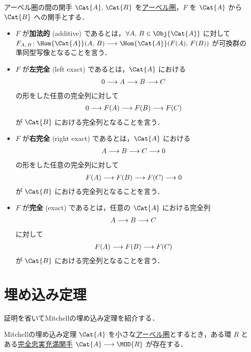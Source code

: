 \documentclass[algtopo_main]{subfiles}
\begin{document}
\begin{mydef}[label=def:Ab-func]{アーベル圏の間の関手}
    $\Cat{A},\, \Cat{B}$ を\hyperref[def:Abel]{アーベル圏}，$F$ を $\Cat{A}$ から $\Cat{B}$ への関手とする．
    \begin{itemize}
        \item $F$ が\textbf{加法的} (additive) であるとは，$\forall A,\, B \in \Obj{\Cat{A}}$ に対して
        $F_{A,\, B} \colon \Hom{\Cat{A}}(A,\, B) \lto \Hom{\Cat{A}} (F(A),\, F(B))$ が可換群の準同型写像となることを言う．
        \item $F$ が\textbf{左完全} (left exact) であるとは，$\Cat{A}$ における
        \begin{align}
            0 \longrightarrow A \longrightarrow B \longrightarrow C
        \end{align}
        の形をした任意の完全列に対して
        \begin{align}
            0 \longrightarrow F(A) \longrightarrow F(B) \longrightarrow F(C)
        \end{align}
        が $\Cat{B}$ における完全列となることを言う．
        \item $F$ が\textbf{右完全} (right exact) であるとは，$\Cat{A}$ における
        \begin{align}
            A \longrightarrow B \longrightarrow C \longrightarrow 0
        \end{align}
        の形をした任意の完全列に対して
        \begin{align}
            F(A) \longrightarrow F(B) \longrightarrow F(C) \longrightarrow 0
        \end{align}
        が $\Cat{B}$ における完全列となることを言う．
        \item $F$ が\textbf{完全} (exact) であるとは，任意の $\Cat{A}$ における完全列
        \begin{align}
            A \longrightarrow B \longrightarrow C
        \end{align}
        に対して
        \begin{align}
            F(A) \longrightarrow F(B) \longrightarrow F(C)
        \end{align}
        が $\Cat{B}$ における完全列となることを言う．
    \end{itemize}
\end{mydef}


\section{埋め込み定理}

証明を省いてMitchellの埋め込み定理を紹介する．

\begin{mytheo}[label=thm:embedding]{Mitchellの埋め込み定理}
    $\Cat{A}$ を小さな\hyperref[def:Abel]{アーベル圏}とするとき，ある環 $R$ とある\hyperref[def:Ab-func]{完全}\hyperref[def:faithful]{忠実充満関手} $\Cat{A} \lto \MOD{R}$ が存在する．
\end{mytheo}
\end{document}
